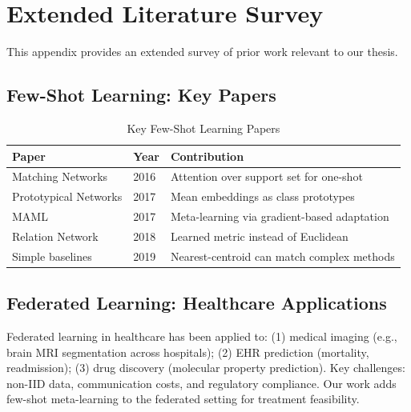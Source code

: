 \chapter{Extended Literature Survey}
\label{app:literature}

This appendix provides an extended survey of prior work relevant to our thesis.

\section{Few-Shot Learning: Key Papers}

\begin{table}[htbp]
\centering
\caption{Key Few-Shot Learning Papers}
\small
\begin{tabular}{llp{5cm}}
\toprule
\textbf{Paper} & \textbf{Year} & \textbf{Contribution} \\
\midrule
Matching Networks & 2016 & Attention over support set for one-shot \\
Prototypical Networks & 2017 & Mean embeddings as class prototypes \\
MAML & 2017 & Meta-learning via gradient-based adaptation \\
Relation Network & 2018 & Learned metric instead of Euclidean \\
Simple baselines & 2019 & Nearest-centroid can match complex methods \\
\bottomrule
\end{tabular}
\label{tab:fsl_papers}
\end{table}

\section{Federated Learning: Healthcare Applications}

Federated learning in healthcare has been applied to: (1) medical imaging (e.g., brain MRI segmentation across hospitals); (2) EHR prediction (mortality, readmission); (3) drug discovery (molecular property prediction). Key challenges: non-IID data, communication costs, and regulatory compliance. Our work adds few-shot meta-learning to the federated setting for treatment feasibility.

